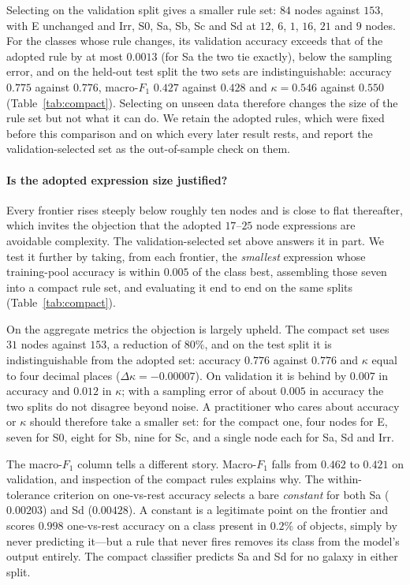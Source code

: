 \documentclass[11pt]{article}
\begin{document}
Selecting on the validation split gives a smaller rule set: $84$ nodes against
$153$, with E unchanged and Irr, S0, Sa, Sb, Sc and Sd at $12$, $6$, $1$, $16$, $21$
and $9$ nodes. For the classes whose rule changes, its validation accuracy exceeds
that of the adopted rule by at most $0.0013$ (for Sa the two tie exactly), below
the sampling error, and on the held-out test split the two sets are
indistinguishable: accuracy $0.775$ against $0.776$, macro-$F_1$
$0.427$ against $0.428$ and $\kappa = 0.546$ against
$0.550$ (Table~\ref{tab:compact}). Selecting on unseen data therefore changes the
size of the rule set but not what it can do. We retain the adopted rules, which
were fixed before this comparison and on which every later result rests, and
report the validation-selected set as the out-of-sample check on them.

\paragraph{Is the adopted expression size justified?}
Every frontier rises steeply below roughly ten nodes and is close to flat
thereafter, which invites the objection that the adopted $17$--$25$ node
expressions are avoidable complexity. The validation-selected set above answers
it in part. We test it further by taking, from each frontier, the
\emph{smallest} expression whose training-pool accuracy is within $0.005$ of the
class best, assembling those seven into a compact rule set, and evaluating it
end to end on the same splits (Table~\ref{tab:compact}).

On the aggregate metrics the objection is largely upheld. The compact set uses
$31$ nodes against $153$, a reduction of $80\%$, and on the test split it is
indistinguishable from the adopted set: accuracy $0.776$ against $0.776$ and
$\kappa$ equal to four decimal places ($\Delta\kappa = -0.00007$). On
validation it is behind by $0.007$ in accuracy and $0.012$ in $\kappa$; with a
sampling error of about $0.005$ in accuracy the two splits do not disagree
beyond noise. A practitioner who cares about accuracy or $\kappa$ should
therefore take a smaller set: for the compact one, four nodes for E, seven for
S0, eight for Sb, nine for Sc, and a single node each for Sa, Sd and Irr.

The macro-$F_1$ column tells a different story. Macro-$F_1$ falls from $0.462$
to $0.421$ on validation, and inspection of the compact rules explains why. The
within-tolerance criterion on one-vs-rest accuracy selects a bare \emph{constant}
for both Sa ($0.00203$) and Sd ($0.00428$). A constant is a legitimate point on
the frontier and scores $0.998$ one-vs-rest accuracy on a class present in
$0.2\%$ of objects, simply by never predicting it---but a rule that never fires
removes its class from the model's output entirely. The compact classifier
predicts Sa and Sd for no galaxy in either split.
\end{document}

